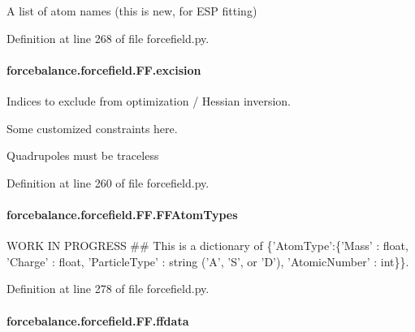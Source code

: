 A list of atom names (this is new, for E\-S\-P fitting) 



Definition at line 268 of file forcefield.\-py.

\hypertarget{classforcebalance_1_1forcefield_1_1FF_ad573c583207080fa66592bcbf788cbad}{
\paragraph[{excision}]{\setlength{\rightskip}{0pt plus 5cm}forcebalance.\-forcefield.\-F\-F.\-excision}}\label{classforcebalance_1_1forcefield_1_1FF_ad573c583207080fa66592bcbf788cbad}


Indices to exclude from optimization / Hessian inversion. 

Some customized constraints here.

Quadrupoles must be traceless 

Definition at line 260 of file forcefield.\-py.

\hypertarget{classforcebalance_1_1forcefield_1_1FF_a38e238188fdd105477cd3ad38ca3753b}{
\paragraph[{F\-F\-Atom\-Types}]{\setlength{\rightskip}{0pt plus 5cm}forcebalance.\-forcefield.\-F\-F.\-F\-F\-Atom\-Types}}\label{classforcebalance_1_1forcefield_1_1FF_a38e238188fdd105477cd3ad38ca3753b}


W\-O\-R\-K I\-N P\-R\-O\-G\-R\-E\-S\-S \#\# This is a dictionary of \{'Atom\-Type'\-:\{'Mass' \-: float, 'Charge' \-: float, 'Particle\-Type' \-: string ('A', 'S', or 'D'), 'Atomic\-Number' \-: int\}\}. 



Definition at line 278 of file forcefield.\-py.

\hypertarget{classforcebalance_1_1forcefield_1_1FF_aa33e01455044a76e265e6eafbf9c90d6}{
\paragraph[{ffdata}]{\setlength{\rightskip}{0pt plus 5cm}forcebalance.\-forcefield.\-F\-F.\-ffdata}}\label{classforcebalance_1_1forcefield_1_1FF_aa33e01455044a76e265e6eafbf9c90d6}


